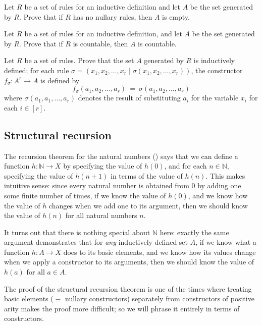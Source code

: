 \begin{exercise}
Let $R$ be a set of rules for an inductive definition and let $A$ be the set generated by $R$. Prove that if $R$ has no nullary rules, then $A$ is empty.
\end{exercise}

\begin{exercise}
Let $R$ be a set of rules for an inductive definition, and let $A$ be the set generated by $R$. Prove that if $R$ is countable, then $A$ is countable.
\end{exercise}

\begin{exercise}
\label{exSetGeneratedByRulesIsInductivelyDefined}
Let $R$ be a set of rules. Prove that the set $A$ generated by $R$ is inductively defined; for each rule $\sigma = (x_1,x_2,\dots,x_r \mid \sigma(x_1,x_2,\dots,x_r))$, the constructor $f_{\sigma} : A^r \to A$ is defined by
\[ f_{\sigma}(a_1,a_2,\dots,a_r) ~=~ \sigma(a_1,a_2,\dots,a_r) \]
where $\sigma(a_1,a_1,\dots,a_r)$ denotes the result of substituting $a_i$ for the variable $x_i$ for each $i \in [r]$.
\end{exercise}

\subsection*{Structural recursion}

The recursion theorem for the natural numbers () says that we can define a function $h : \mathbb{N} \to X$ by specifying the value of $h(0)$, and for each $n \in \mathbb{N}$, specifying the value of $h(n+1)$ in terms of the value of $h(n)$. This makes intuitive sense: since every natural number is obtained from $0$ by adding one some finite number of times, if we know the value of $h(0)$, and we know how the value of $h$ changes when we add one to its argument, then we should know the value of $h(n)$ for all natural numbers $n$.

It turns out that there is nothing special about $\mathbb{N}$ here: exactly the same argument demonstrates that for \textit{any} inductively defined set $A$, if we know what a function $h : A \to X$ does to its basic elements, and we know how its values change when we apply a constructor to its arguments, then we should know the value of $h(a)$ for all $a \in A$.

The proof of the structural recursion theorem is one of the times where treating basic elements ($\equiv$ nullary constructors) separately from constructors of positive arity makes the proof more difficult; so we will phrase it entirely in terms of constructors.

